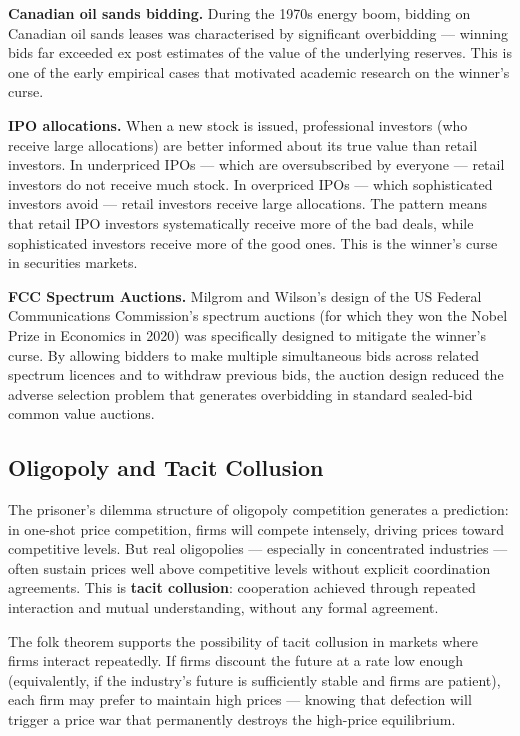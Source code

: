 \documentclass[12pt, letterpaper]{article}
\begin{document}
\textbf{Canadian oil sands bidding.} During the 1970s energy boom, bidding on Canadian oil sands leases was characterised by significant overbidding --- winning bids far exceeded ex post estimates of the value of the underlying reserves. This is one of the early empirical cases that motivated academic research on the winner's curse.

\textbf{IPO allocations.} When a new stock is issued, professional investors (who receive large allocations) are better informed about its true value than retail investors. In underpriced IPOs --- which are oversubscribed by everyone --- retail investors do not receive much stock. In overpriced IPOs --- which sophisticated investors avoid --- retail investors receive large allocations. The pattern means that retail IPO investors systematically receive more of the bad deals, while sophisticated investors receive more of the good ones. This is the winner's curse in securities markets.

\textbf{FCC Spectrum Auctions.} Milgrom and Wilson's design of the US Federal Communications Commission's spectrum auctions (for which they won the Nobel Prize in Economics in 2020) was specifically designed to mitigate the winner's curse. By allowing bidders to make multiple simultaneous bids across related spectrum licences and to withdraw previous bids, the auction design reduced the adverse selection problem that generates overbidding in standard sealed-bid common value auctions.


\subsection{Oligopoly and Tacit Collusion}


The prisoner's dilemma structure of oligopoly competition generates a prediction: in one-shot price competition, firms will compete intensely, driving prices toward competitive levels. But real oligopolies --- especially in concentrated industries --- often sustain prices well above competitive levels without explicit coordination agreements. This is \textbf{tacit collusion}: cooperation achieved through repeated interaction and mutual understanding, without any formal agreement.

The folk theorem supports the possibility of tacit collusion in markets where firms interact repeatedly. If firms discount the future at a rate low enough (equivalently, if the industry's future is sufficiently stable and firms are patient), each firm may prefer to maintain high prices --- knowing that defection will trigger a price war that permanently destroys the high-price equilibrium.
\end{document}
